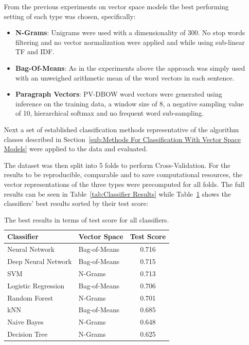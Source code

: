 From the previous experiments on vector space models the best performing setting of each type was chosen, specifically:

\begin{itemize}
  \item \textbf{N-Grams}: Unigrams were used with a dimensionality of 300. No stop words filtering and no vector normalization were applied and while using sub-linear TF and IDF.
  \item \textbf{Bag-Of-Means}: As in the experiments above the approach was simply used with an unweighed arithmetic mean of the word vectors in each sentence.
  \item \textbf{Paragraph Vectors}: PV-DBOW word vectors were generated using inference on the training data, a window size of 8, a negative sampling value of 10, hierarchical softmax and no frequent word sub-sampling.
\end{itemize}

Next a set of established classification methods representative of the algorithm classes described in Section~\ref{sub:Methods For Classification With Vector Space Models} were applied to the data and evaluated.

The dataset was then split into 5 folds to perform \gls{Cross-Validation}. For the results to be reproducible, comparable and to save computational resources, the vector representations of the three types were precomputed for all folds. The full results can be seen in Table~\ref{tab:Classifier Results} while Table~\ref{tab:Test Scores sorted} shows the classifiers' best results sorted by their test score:


\begin{table}[h]
\centering
\begin{tabular}{ l l c }
  \toprule
  Classifier & Vector Space & Test Score \\
  \midrule
  Neural Network & Bag-of-Means & 0.716 \\
  Deep Neural Network & Bag-of-Means & 0.715 \\
  SVM & N-Grams & 0.713 \\
  Logistic Regression & Bag-of-Means & 0.706 \\
  Random Forest & N-Grams & 0.701 \\
  kNN & Bag-of-Means & 0.685 \\
  Naive Bayes & N-Grams & 0.648 \\
  Decision Tree & N-Grams & 0.625 \\
  \bottomrule
\end{tabular}
\caption{The best results in terms of test score for all classifiers.}
\label{tab:Test Scores sorted}
\end{table}


